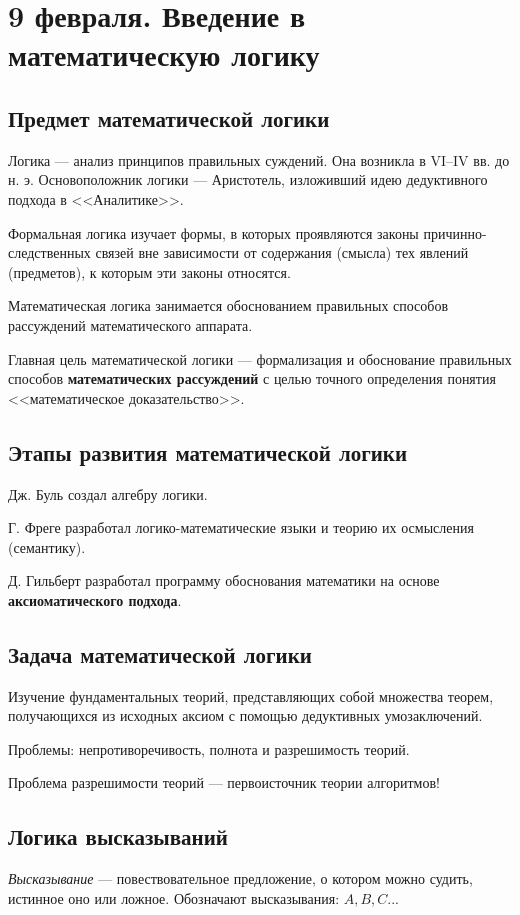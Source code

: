 \chapter{9 февраля. Введение в математическую логику}
\section{Предмет математической логики}
\dftion Логика --- анализ принципов правильных суждений. Она возникла в VI--IV вв. до н. э. Основоположник логики --- Аристотель, изложивший идею дедуктивного подхода в <<Аналитике>>.

\dftion Формальная логика изучает формы, в которых проявляются законы причинно-следственных связей вне зависимости от содержания (смысла) тех явлений (предметов), к которым эти законы относятся.

\dftion Математическая логика занимается обоснованием правильных способов рассуждений математического аппарата.

Главная цель математической логики --- формализация и обоснование правильных способов \textbf{математических рассуждений} с целью точного определения понятия <<математическое доказательство>>.

\section{Этапы развития математической логики}
Дж. Буль создал алгебру логики.

Г. Фреге разработал логико-математические языки и теорию их осмысления (семантику).

Д. Гильберт разработал программу обоснования математики на основе \textbf{аксиоматического подхода}.

\section{Задача математической логики}
Изучение фундаментальных теорий, представляющих собой множества теорем, получающихся из исходных аксиом с помощью дедуктивных умозаключений.

Проблемы: непротиворечивость, полнота и разрешимость теорий.

Проблема разрешимости теорий --- первоисточник теории алгоритмов!

\section{Логика высказываний}
\textit{Высказывание} --- повествовательное предложение, о котором можно судить, истинное оно или ложное. Обозначают высказывания: $A, B, C$...

